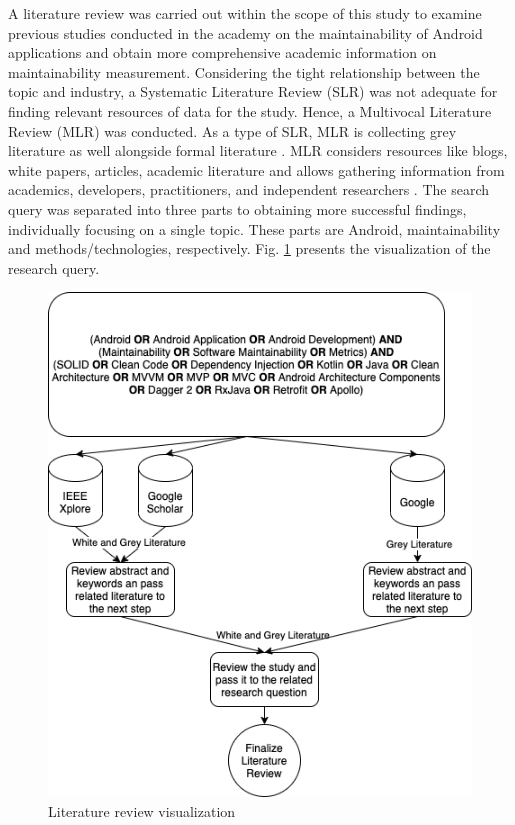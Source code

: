 A literature review was carried out within the scope of this study to examine previous studies conducted in the academy on the maintainability of Android applications and obtain more comprehensive academic information on maintainability measurement. Considering the tight relationship between the topic and industry, a Systematic Literature Review (SLR) was not adequate for finding relevant resources of data for the study. Hence, a Multivocal Literature Review (MLR) was conducted. As a type of SLR, MLR is collecting grey literature as well alongside formal literature \cite{40}. MLR considers resources like blogs, white papers, articles, academic literature and allows gathering information from academics, developers, practitioners, and independent researchers \cite{41}. The search query was separated into three parts to obtaining more successful findings, individually focusing on a single topic. These parts are Android, maintainability and methods/technologies, respectively. Fig. \ref{fig:lit_review_research_query} presents the visualization of the research query.
\begin{figure}[ht!] 
    \centering
    \includegraphics[scale=0.5]{figures/research_query.png}
    \caption{Literature review visualization}
    \label{fig:lit_review_research_query}
\end{figure}
\FloatBarrier

